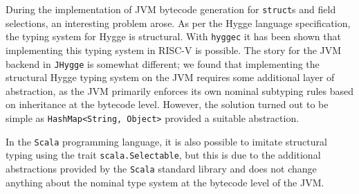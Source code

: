 During the implementation of JVM bytecode generation for \texttt{struct}s and field selections, an interesting problem arose.
As per the Hygge language specification, the typing system for Hygge is structural. With \texttt{hyggec} it has been shown
that implementing this typing system in RISC-V is possible. The story for the JVM backend in \texttt{JHygge} is somewhat different;
we found that implementing the structural Hygge typing system on the JVM requires some additional layer of abstraction, as
the JVM primarily enforces its own nominal subtyping rules based on inheritance at the bytecode level.
However, the solution turned out to be simple as \texttt{HashMap<String, Object>}\cite{hashmap} provided a suitable abstraction.

In the \texttt{Scala} programming language, it is also possible to imitate structural typing using the trait \texttt{scala.Selectable}\cite{scala3}, but this is
due to the additional abstractions provided by the \texttt{Scala} standard library and does not change anything about the nominal
type system at the bytecode level of the JVM.

